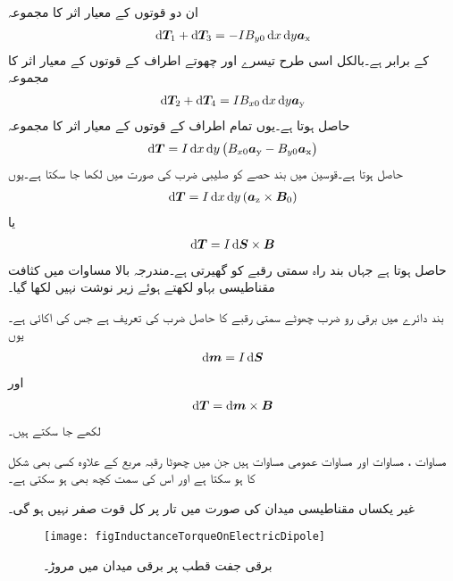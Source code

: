 ان دو قوتوں کے معیار اثر کا مجموعہ
\begin{align*}
\dif \kvec{T}_1+\dif \kvec{T}_3=-IB_{y0}\dif x \dif y\ax
\end{align*}
کے برابر ہے۔بالکل اسی طرح تیسرے اور چھوتے اطراف کے قوتوں کے معیار اثر کا مجموعہ
\begin{align*}
\dif \kvec{T}_2+\dif \kvec{T}_4=IB_{x0}\dif x \dif y\ay
\end{align*}
حاصل ہوتا ہے۔یوں تمام اطراف کے قوتوں کے معیار اثر کا مجموعہ
\begin{align*}
\dif \kvec{T}=I \dif x \dif y \left(B_{x0}\ay-B_{y0}\ax \right)
\end{align*}
حاصل ہوتا ہے۔قوسین میں بند حصے کو صلیبی ضرب کی صورت میں لکھا جا سکتا ہے۔یوں
\begin{align*}
\dif \kvec{T}=I \dif x \dif y \left(\az \times \kvec{B}_0 \right)
\end{align*}
یا
\begin{align}\label{مساوات_امالہ_تفرقی_مروڑ_عمومی}
\dif \kvec{T}=I \dif \kvec{S} \times \kvec{B}
\end{align}
حاصل ہوتا ہے جہاں بند راہ سمتی رقبے  کو گھیرتی ہے۔مندرجہ بالا مساوات میں کثافت مقناطیسی بہاو  لکھتے ہوئے زیر نوشت نہیں لکھا گیا۔

بند دائرے میں برقی رو ضرب چھوٹے سمتی رقبے  کا حاصل ضرب   کی تعریف ہے جس کی اکائی  ہے۔یوں
\begin{align}\label{مساوات-امالہ_مقناطیسی_جفت_قطب_معیار_اثر}
\dif \kvec{m}=I \dif \kvec{S}
\end{align}
اور
\begin{align}\label{مساوات_امالہ_تفرقی_مروڑ}
\dif \kvec{T} =\dif \kvec{m} \times \kvec{B}
\end{align}
لکھے جا سکتے ہیں۔

مساوات ، مساوات  اور مساوات  عمومی مساوات ہیں جن میں چھوٹا رقبہ  مربع کے علاوہ کسی بھی شکل کا ہو سکتا ہے اور اس کی سمت کچھ بھی ہو سکتی ہے۔

غیر یکساں مقناطیسی میدان کی صورت میں تار پر کل قوت صفر نہیں ہو گی۔

\begin{figure}
\centering
\texttt{[image: figInductanceTorqueOnElectricDipole]}
\caption{برقی جفت قطب پر برقی میدان میں مروڑ۔}
\label{شکل_امالہ_برقی_جفت_قطب_مروڑ}
\end{figure}


